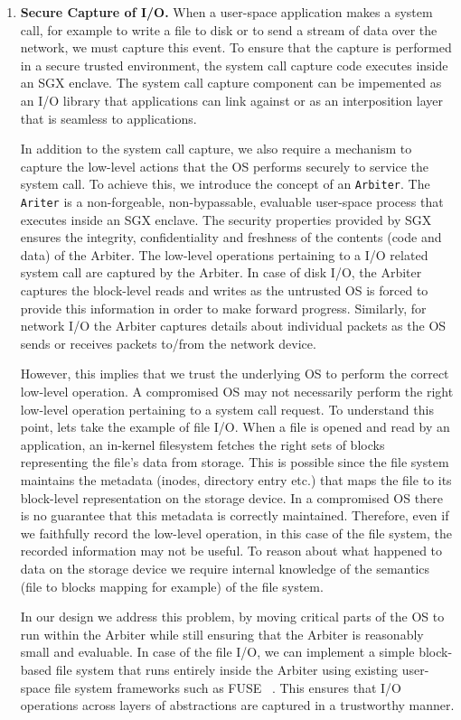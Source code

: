 \documentclass[withindex,glossary]{cam-thesis}
\begin{document}
\begin{enumerate}
\item \textbf{Secure Capture of I/O.}
When a user-space application makes a system call, for example to write a file to disk or to send a stream of data over the network, we must capture this event.
To ensure that the capture is performed in a secure trusted environment, the system call capture code executes inside an SGX enclave.
The system call capture component can be impemented as an I/O library that applications can link against or as an interposition layer that is seamless to applications.

In addition to the system call capture, we also require a mechanism to capture the low-level actions that the OS performs securely to service the system call.
To achieve this, we introduce the concept of an \texttt{Arbiter}.
The \texttt{Ariter} is a non-forgeable, non-bypassable, evaluable user-space process that executes inside an SGX enclave.
The security properties provided by SGX ensures the integrity, confidentiality and freshness of the contents (code and data) of the Arbiter.
The low-level operations pertaining to a I/O related system call are captured by the Arbiter.
In case of disk I/O, the Arbiter captures the block-level reads and writes as the untrusted OS is forced to provide this information in order to make forward progress.
Similarly, for network I/O the Arbiter captures details about individual packets as the OS sends or receives packets to/from the network device.

However, this implies that we trust the underlying OS to perform the correct low-level operation.
A compromised OS may not necessarily perform the right low-level operation pertaining to a system call request.
To understand this point, lets take the example of file I/O.
When a file is opened and read by an application, an in-kernel filesystem fetches the right sets of blocks representing the file's data from storage.
This is possible since the file system maintains the metadata (inodes, directory entry etc.) that maps the file to its block-level representation on the storage device.
In a compromised OS there is no guarantee that this metadata is correctly maintained.
Therefore, even if we faithfully record the low-level operation, in this case of the file system, the recorded information may not be useful.
To reason about what happened to data on the storage device we require internal knowledge of the semantics (file to blocks mapping for example) of the file system.

In our design we address this problem, by moving critical parts of the OS to run within the Arbiter while still ensuring that the Arbiter is reasonably small and evaluable.
In case of the file I/O, we can implement a simple block-based file system that runs entirely inside the Arbiter using existing user-space file system frameworks such as FUSE ~\cite{FUSE}.
This ensures that I/O operations across layers of abstractions are captured in a trustworthy manner.


\end{enumerate}
\end{document}
